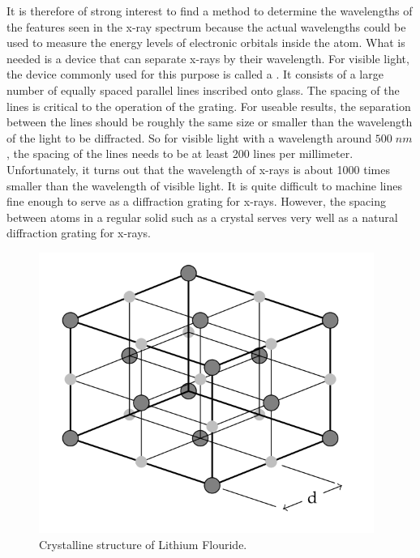 \noindent It is therefore of strong interest to find a method to determine the wavelengths of the features seen in the x-ray spectrum because the actual wavelengths could be used to measure the energy levels of electronic orbitals inside the atom. What is needed is a device that can separate x-rays by their wavelength. For visible light, the device commonly used for this purpose is called a . It consists of a large number of equally spaced parallel lines inscribed onto glass. The spacing of the lines is critical to the operation of the grating. For useable results, the separation between the lines should be roughly the same size or smaller than the wavelength of the light to be diffracted. So for visible light with a wavelength around $500 \;nm$, the spacing of the lines needs to be at least 200 lines per millimeter. Unfortunately, it turns out that the wavelength of x-rays is about 1000 times smaller than the wavelength of visible light. It is quite difficult to machine lines fine enough to serve as a diffraction grating for x-rays. However, the spacing between atoms in a regular solid such as a crystal serves very well as a natural diffraction grating for x-rays.


\begin{figure}[H]
\centering
\includegraphics[scale = 0.8]{Images/XR6.PNG}
\caption{Crystalline structure of Lithium Flouride.}
\label{fig:XR6}
\end{figure}


